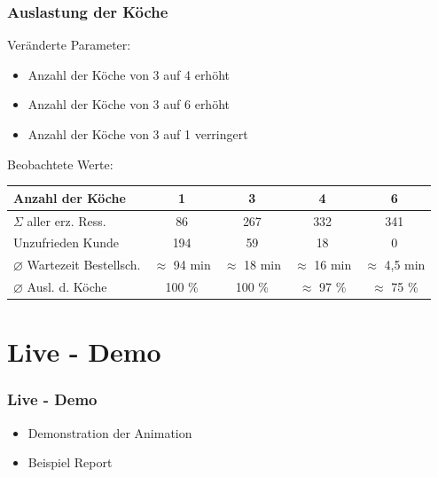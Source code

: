 \documentclass{beamer}
\begin{document}
\begin{frame} %
  \frametitle{Auslastung der Köche} %
	Veränderte Parameter:
  \begin{itemize}
  	\item Anzahl der Köche von 3 auf 4 erhöht
  	\item Anzahl der Köche von 3 auf 6 erhöht
  	\item Anzahl der Köche von 3 auf 1 verringert
  \end{itemize}
  
  Beobachtete Werte:
  \newline

	
\begin{tabular}{|l|c|c|c|c|}\hline 
    Anzahl der Köche	& 1 &	 3 &	 4  &	 6\\ \hline \hline
   $\Sigma$ aller erz. Ress.&86&267&332 &  341\\ \hline
   Unzufrieden Kunde &	194 &	59 &18	 &0 \\ \hline
   $\diameter$ Wartezeit Bestellsch. &$ \approx$ 94 min & $\approx$ 18 min  &$\approx$ 16 min &$\approx$ 4,5 min \\ \hline
  $\diameter$  Ausl. d. Köche & 100 \% & 100 \% & $\approx$ 97 \% & $ \approx$ 75 \% \\ \hline
 \end{tabular}
  
\end{frame}

\section{Live - Demo}
\begin{frame} %
  \frametitle{Live - Demo } %
  \begin{itemize}
  	\item Demonstration der Animation
  	\item Beispiel Report
  \end{itemize}
\end{frame}
\end{document}
